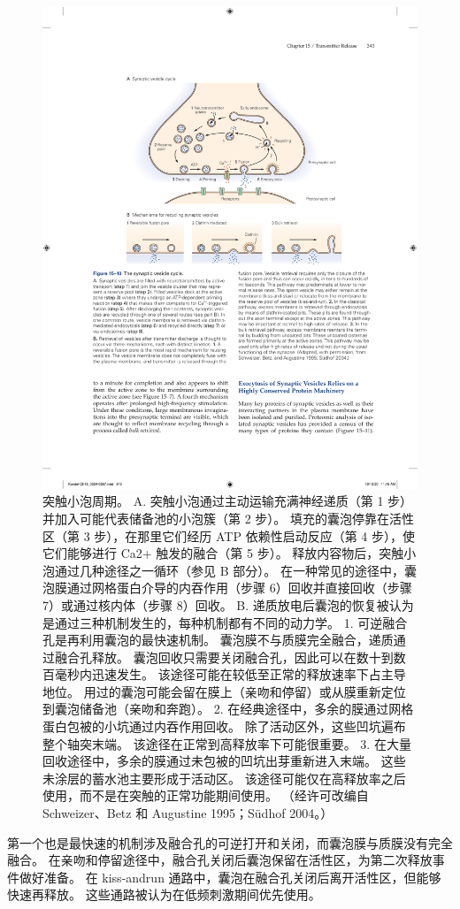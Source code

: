 \begin{figure}[htbp]
	\centering
	\includegraphics[width=0.7\linewidth]{chap15/fig_15_10}
	\caption{突触小泡周期。 A. 突触小泡通过主动运输充满神经递质（第 1 步）并加入可能代表储备池的小泡簇（第 2 步）。 填充的囊泡停靠在活性区（第 3 步），在那里它们经历 ATP 依赖性启动反应（第 4 步），使它们能够进行 Ca2+ 触发的融合（第 5 步）。 释放内容物后，突触小泡通过几种途径之一循环（参见 B 部分）。 在一种常见的途径中，囊泡膜通过网格蛋白介导的内吞作用（步骤 6）回收并直接回收（步骤 7）或通过核内体（步骤 8）回收。 B. 递质放电后囊泡的恢复被认为是通过三种机制发生的，每种机制都有不同的动力学。 1. 可逆融合孔是再利用囊泡的最快速机制。 囊泡膜不与质膜完全融合，递质通过融合孔释放。 囊泡回收只需要关闭融合孔，因此可以在数十到数百毫秒内迅速发生。 该途径可能在较低至正常的释放速率下占主导地位。 用过的囊泡可能会留在膜上（亲吻和停留）或从膜重新定位到囊泡储备池（亲吻和奔跑）。 2. 在经典途径中，多余的膜通过网格蛋白包被的小坑通过内吞作用回收。 除了活动区外，这些凹坑遍布整个轴突末端。 该途径在正常到高释放率下可能很重要。 3. 在大量回收途径中，多余的膜通过未包被的凹坑出芽重新进入末端。 这些未涂层的蓄水池主要形成于活动区。 该途径可能仅在高释放率之后使用，而不是在突触的正常功能期间使用。 （经许可改编自 Schweizer、Betz 和 Augustine 1995；Südhof 2004。）}
	\label{fig:15_10}
\end{figure}


第一个也是最快速的机制涉及融合孔的可逆打开和关闭，而囊泡膜与质膜没有完全融合。 
在亲吻和停留途径中，融合孔关闭后囊泡保留在活性区，为第二次释放事件做好准备。 
在 kiss-andrun 通路中，囊泡在融合孔关闭后离开活性区，但能够快速再释放。 
这些通路被认为在低频刺激期间优先使用。


